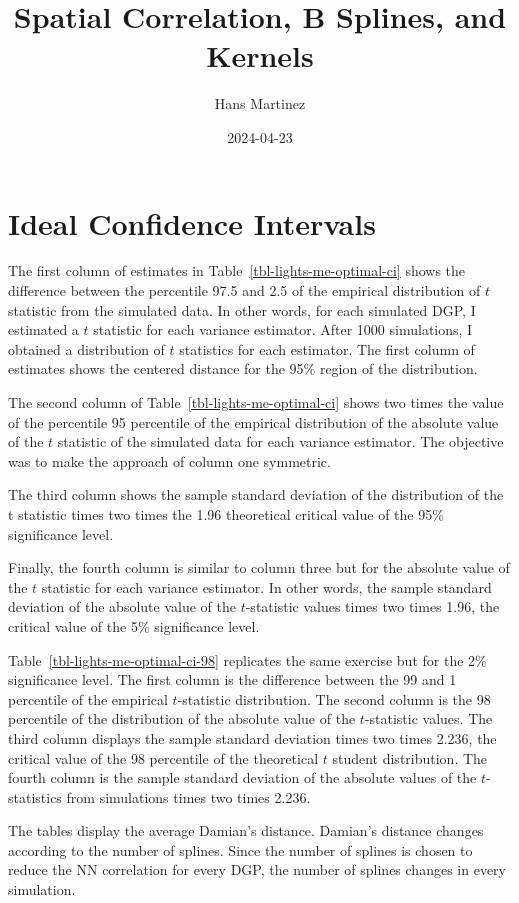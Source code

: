 \documentclass[
]{article}
\title{Spatial Correlation, B Splines, and Kernels}
\author{Hans Martinez}
\date{2024-04-23}
\begin{document}
\maketitle

\section{Ideal Confidence Intervals}\label{ideal-confidence-intervals}

The first column of estimates in Table~\ref{tbl-lights-me-optimal-ci}
shows the difference between the percentile 97.5 and 2.5 of the
empirical distribution of \(t\) statistic from the simulated data. In
other words, for each simulated DGP, I estimated a \(t\) statistic for
each variance estimator. After 1000 simulations, I obtained a
distribution of \(t\) statistics for each estimator. The first column of
estimates shows the centered distance for the 95\% region of the
distribution.

The second column of Table~\ref{tbl-lights-me-optimal-ci} shows two
times the value of the percentile 95 percentile of the empirical
distribution of the absolute value of the \(t\) statistic of the
simulated data for each variance estimator. The objective was to make
the approach of column one symmetric.

The third column shows the sample standard deviation of the distribution
of the t statistic times two times the 1.96 theoretical critical value
of the 95\% significance level.

Finally, the fourth column is similar to column three but for the
absolute value of the \(t\) statistic for each variance estimator. In
other words, the sample standard deviation of the absolute value of the
\(t\)-statistic values times two times 1.96, the critical value of the
5\% significance level.

Table~\ref{tbl-lights-me-optimal-ci-98} replicates the same exercise but
for the 2\% significance level. The first column is the difference
between the 99 and 1 percentile of the empirical \(t\)-statistic
distribution. The second column is the 98 percentile of the distribution
of the absolute value of the \(t\)-statistic values. The third column
displays the sample standard deviation times two times 2.236, the
critical value of the 98 percentile of the theoretical \(t\) student
distribution. The fourth column is the sample standard deviation of the
absolute values of the \(t\)-statistics from simulations times two times
2.236.

The tables display the average Damian's distance. Damian's distance
changes according to the number of splines. Since the number of splines
is chosen to reduce the NN correlation for every DGP, the number of
splines changes in every simulation.
\end{document}
